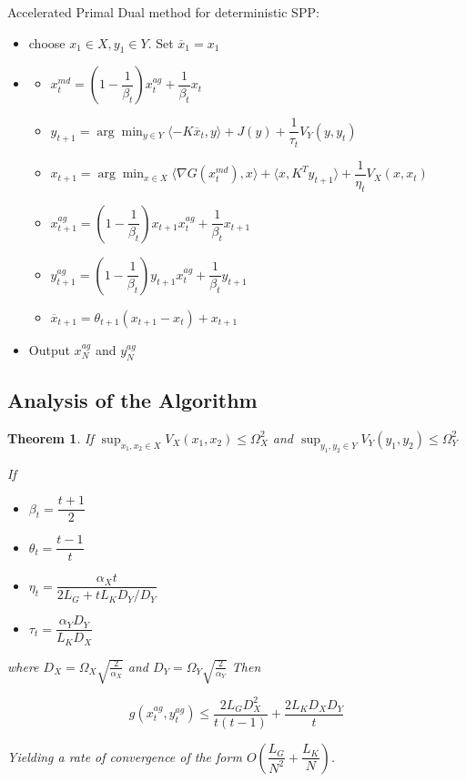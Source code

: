 \documentclass[12pt,reqno]{amsart}
\newtheorem{thm}{Theorem}[section]
\numberwithin{equation}{section}
\begin{document}
Accelerated Primal Dual method for deterministic SPP:
\begin{itemize}
\item choose $x_{1} \in X, y_{1} \in Y$. Set $\overline{x}_{1} = x_{1}$
\item

\begin{itemize}
\item $x_{t}^{md} = (1 - \dfrac{1}{\beta_{t}})x_{t}^{ag} +  \dfrac{1}{\beta_{t}}x_{t}$
\item $y_{t+1} = \arg\min_{y \in Y} \langle -K\overline{x}_{t},y\rangle + J(y) + \dfrac{1}{\tau_{t}}V_{Y}(y,y_{t})$
\item $x_{t+1} = \arg\min_{x \in X} \langle \nabla G(x_{t}^{md}) ,x \rangle + \langle x,K^{T}y_{t+1} \rangle + \dfrac{1}{\eta_{t}}V_{X}(x,x_{t})$
\item $x_{t+1}^{ag} = (1 -  \dfrac{1}{\beta_{t}})x_{t+1}x_{t}^{ag}+ \dfrac{1}{\beta_{t}}x_{t+1}$
\item $y_{t+1}^{ag} = (1 -  \dfrac{1}{\beta_{t}})y_{t+1}x_{t}^{ag}+ \dfrac{1}{\beta_{t}}y_{t+1}$
\item $\overline{x}_{t+1} = \theta_{t+1}(x_{t+1} - x_{t}) + x_{t+1}$
\end{itemize}

\item Output $x_{N}^{ag}$ and $y_{N}^{ag}$
\end{itemize}

\subsection{Analysis of the Algorithm}

\begin{thm}

If $\sup_{x_{1},x_{2} \in X} V_{X}(x_{1},x_{2}) \leq \Omega_{X}^{2}$ and 
$\sup_{y_{1},y_{2} \in Y} V_{Y}(y_{1},y_{2}) \leq \Omega_{Y}^{2}$

If \begin{itemize}
\item $\beta_{t} = \dfrac{t+1}{2}$
\item $\theta_{t} = \dfrac{t-1}{t}$
\item $\eta_{t} = \dfrac{\alpha_{X}t}{2L_{G} + tL_{K}D_{Y}/D_{Y}}$
\item $\tau_{t} = \dfrac{\alpha_{Y}D_{Y}}{L_{K}D_{X}}$
\end{itemize}
where $D_{X} = \Omega_{X}\sqrt{\frac{2}{\alpha_{X}}}$ and $D_{Y} = \Omega_{Y}\sqrt{\frac{2}{\alpha_{Y}}}$
Then

$$
g(x_{t}^{ag},y_{t}^{ag}) \leq \dfrac{2L_{G}D_{X}^{2}}{t(t-1)} + \dfrac{2L_{K}D_{X}D_{Y}}{t}
$$

Yielding a rate of convergence of the form $O(\dfrac{L_{G}}{N^{2}} + \dfrac{L_{K}}{N})$.

\end{thm}
\end{document}
